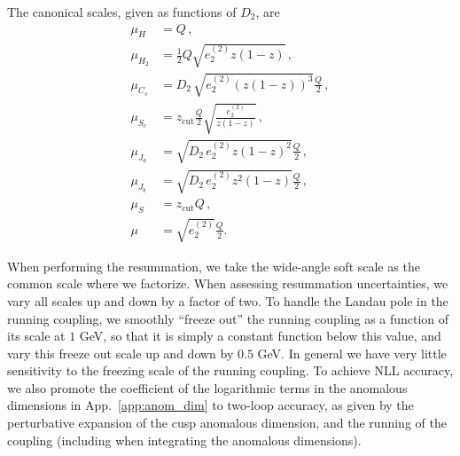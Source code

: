 \documentclass[a4paper,11pt]{article}
\newcommand{\ecf}[2]{e_{#1}^{(#2)}}
\def\zcut{z_{\text{cut}}}
\DeclareRobustCommand{\App}[1]{App.~\ref{#1}}
\begin{document}
The canonical scales, given as functions of $D_2$, are
\begin{align}
\mu_{H}&=Q\,,\\
\mu_{H_2}&=\frac{1}{2}Q\sqrt{\ecf{2}{2}z(1-z)}\,,\\
\mu_{C_s}&=D_2\,\sqrt{\ecf{2}{2}(z(1-z))^{3}}\frac{Q}{2}\,,\\
\mu_{S_c}&=\zcut \frac{Q}{2} \sqrt{\frac{\ecf{2}{2}}{z(1-z)}}\,,\\
\mu_{J_a}&=\sqrt{D_2\,\ecf{2}{2}z(1-z)^2}\frac{Q}{2}\,,\\
\mu_{J_b}&=\sqrt{D_2\,\ecf{2}{2}z^2(1-z)}\frac{Q}{2}\,,\\
\mu_{S}&=\zcut Q\, ,\\
\mu&=\sqrt{\ecf{2}{2}}\frac{Q}{2}.\label{eq:factorization_scale}
\end{align}

When performing the resummation, we take the wide-angle soft scale as the common scale where we factorize. When assessing resummation uncertainties, we vary all scales up and down by a factor of two. To handle the Landau pole in the running coupling, we smoothly ``freeze out'' the running coupling as a function of its scale at $1$ GeV, so that it is simply a constant function below this value, and vary this freeze out scale up and down by $0.5$ GeV. In general we have very little sensitivity to the freezing scale of the running coupling. To achieve NLL accuracy, we also promote the coefficient of the logarithmic terms in the anomalous dimensions in \App{app:anom_dim} to two-loop accuracy, as given by the perturbative expansion of the cusp anomalous dimension, and the running of the coupling (including when integrating the anomalous dimensions).
\end{document}
